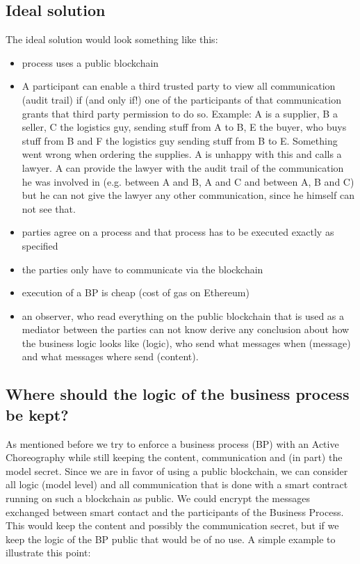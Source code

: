 \documentclass[runningheads]{llncs}
\begin{document}
\subsection{Ideal solution}
The ideal solution would look something like this: 
\begin{itemize}
    \item process uses a public blockchain
    \item A participant can enable a third trusted party to view all communication (audit trail) if (and only if!) one of the participants of that communication grants that third party permission to do so. Example: A is a supplier, B a seller, C the logistics guy, sending stuff from A to B, E the buyer, who buys stuff from B and F the logistics guy sending stuff from B to E. Something went wrong when ordering the supplies. A is unhappy with this and calls a lawyer. A can provide the lawyer with the audit trail of the communication he was involved in (e.g. between A and B, A and C and between A, B and C) but he can not give the lawyer any other communication, since he himself can not see that.
    \item parties agree on a process and that process has to be executed exactly as specified
    \item the parties only have to communicate via the blockchain
    \item execution of a BP is cheap (cost of gas on Ethereum)
    \item an observer, who read everything on the public blockchain that is used as a mediator between the parties can not know derive any conclusion about how the business logic looks like (logic), who send what messages when (message) and what messages where send (content).
\end{itemize}


\subsection{Where should the logic of the business process be kept?}

As mentioned before we try to enforce a business process (BP) with an Active Choreography while still keeping the content, communication and (in part) the model secret. Since we are in favor of using a public blockchain, we can consider all logic (model level) and all communication that is done with a smart contract running on such a blockchain as public. We could encrypt the messages exchanged between smart contact and the participants of the Business Process. This would keep the content and possibly the communication secret, but if we keep the logic of the BP public that would be of no use. A simple example to illustrate this point:
\end{document}
